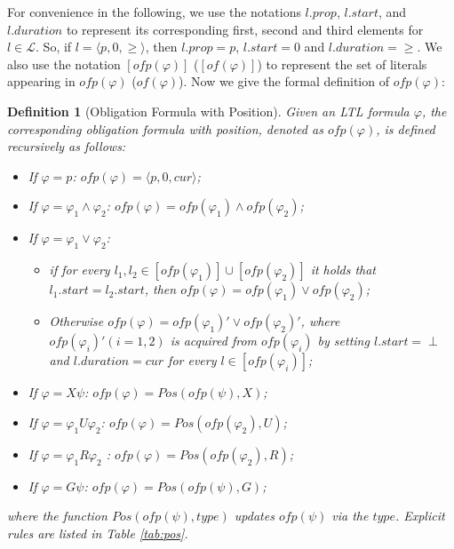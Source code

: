 \documentclass[conference]{IEEEtran}
\newtheorem{definition}{Definition}
\def\phi{\varphi}
\def\of#1{\mathit{of}(#1)}
\def\ofp#1{\mathit{ofp}(#1)}
\def\nondeter{\perp}
\def\cur{\mathit{cur}}
\begin{document}
For convenience in the following, we use the notations $l.prop$,
$l.start$, and $l.duration$ to represent its corresponding first,
second and third elements for $l\in \mathcal{L}$. So, if $l=\langle p,
0, \geq\rangle$, then $l.prop=p$, $l.start=0$ and
$l.duration=\geq$. We also use the notation $[\ofp{\phi}]$ ($[\of{\phi}]$) to represent 
the set of literals appearing in $\ofp{\phi}$ ($\of{\phi}$).  Now we give the
formal definition of $\ofp{\phi}$:

\begin{definition}[Obligation Formula with Position]\label{def:ofp}
    Given an LTL formula $\phi$, the corresponding \textit{obligation formula with position}, denoted 
    as $\ofp{\phi}$, is defined recursively as follows:
    \begin{itemize}
      \item If $\phi=p$: $\ofp{\phi} = \langle p, 0, \cur\rangle$;
      \item If $\phi = \phi_1 \wedge \phi_2$: $\ofp{\phi} = \ofp{\phi_1} \wedge \ofp{\phi_2}$;
      \item If $\phi = \phi_1 \vee \phi_2$: 
      \begin{itemize}
        \item if for every 
      $l_1, l_2\in [\ofp{\phi_1}]\cup [\ofp{\phi_2}]$ it holds that $l_1.start=l_2.start$, then 
      $\ofp{\phi} = \ofp{\phi_1}\vee \ofp{\phi_2}$; 
    \item Otherwise $\ofp{\phi}=\ofp{\phi_1}'\vee \ofp{\phi_2}'$,
      where $\ofp{\phi_i}' (i=1,2)$ is acquired from $\ofp{\phi_i}$ by setting
      $l.start = \nondeter$ and $l.duration=\cur$ for every $l\in
      [\ofp{\phi_i}]$;
      \end{itemize}
      \item If $\phi = X\psi$: $\ofp{\phi} = Pos(\ofp{\psi}, X)$; 
      \item If $\phi = \phi_1 U \phi_2$: $\ofp{\phi} = Pos(\ofp{\phi_2}, U)$;
      \item If $\phi = \phi_1 R \phi_2$ : $\ofp{\phi} = Pos(\ofp{\phi_2}, R)$;       
      \item If $\phi = G\psi$: $\ofp{\phi} = Pos(\ofp{\psi}, G)$;
    \end{itemize}
    where the function $Pos(\ofp{\psi}, type)$ updates $\ofp{\psi}$
    via the $type$.  Explicit rules are listed in
    Table \ref{tab:pos}.
  

\end{definition}
\end{document}
